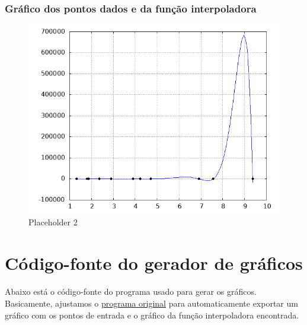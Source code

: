 \documentclass{article}
\begin{document}
                \subsubsection{Gráfico dos pontos dados e da função interpoladora}
                    \begin{figure}[H]
                        \centering
                        \includegraphics[width=0.5\linewidth]{exemplo3.png}
                        \caption{Placeholder 2}
                        \label{fig:placeholder3}
                    \end{figure}

\newpage
\section{Código-fonte do gerador de gráficos}
\paragraph{} Abaixo está o código-fonte do programa usado para gerar os gráficos. Basicamente, ajustamos o \hyperref[sec:codigofonte1]{programa original} para automaticamente exportar um gráfico com os pontos de entrada e o gráfico da função interpoladora encontrada.


\end{document}
